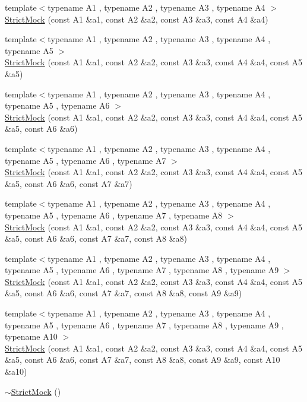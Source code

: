 \begin{DoxyCompactItemize}
\item 
{\footnotesize template$<$typename A1 , typename A2 , typename A3 , typename A4 $>$ }\\\mbox{\hyperlink{classtesting_1_1_strict_mock_a6b42ef1460901ea91a2a09f44ae8fba2}{Strict\+Mock}} (const A1 \&a1, const A2 \&a2, const A3 \&a3, const A4 \&a4)
\item 
{\footnotesize template$<$typename A1 , typename A2 , typename A3 , typename A4 , typename A5 $>$ }\\\mbox{\hyperlink{classtesting_1_1_strict_mock_a2019f4e86224b2adbb9e9326bc175c50}{Strict\+Mock}} (const A1 \&a1, const A2 \&a2, const A3 \&a3, const A4 \&a4, const A5 \&a5)
\item 
{\footnotesize template$<$typename A1 , typename A2 , typename A3 , typename A4 , typename A5 , typename A6 $>$ }\\\mbox{\hyperlink{classtesting_1_1_strict_mock_a17b452e1e2f57d7d10f7209587376eef}{Strict\+Mock}} (const A1 \&a1, const A2 \&a2, const A3 \&a3, const A4 \&a4, const A5 \&a5, const A6 \&a6)
\item 
{\footnotesize template$<$typename A1 , typename A2 , typename A3 , typename A4 , typename A5 , typename A6 , typename A7 $>$ }\\\mbox{\hyperlink{classtesting_1_1_strict_mock_a4af48752fc22815250369292b9c064bc}{Strict\+Mock}} (const A1 \&a1, const A2 \&a2, const A3 \&a3, const A4 \&a4, const A5 \&a5, const A6 \&a6, const A7 \&a7)
\item 
{\footnotesize template$<$typename A1 , typename A2 , typename A3 , typename A4 , typename A5 , typename A6 , typename A7 , typename A8 $>$ }\\\mbox{\hyperlink{classtesting_1_1_strict_mock_aac6eaaad3e94491ada7bb43ee6149775}{Strict\+Mock}} (const A1 \&a1, const A2 \&a2, const A3 \&a3, const A4 \&a4, const A5 \&a5, const A6 \&a6, const A7 \&a7, const A8 \&a8)
\item 
{\footnotesize template$<$typename A1 , typename A2 , typename A3 , typename A4 , typename A5 , typename A6 , typename A7 , typename A8 , typename A9 $>$ }\\\mbox{\hyperlink{classtesting_1_1_strict_mock_a4129f247ae087d586fdb04f450422d3e}{Strict\+Mock}} (const A1 \&a1, const A2 \&a2, const A3 \&a3, const A4 \&a4, const A5 \&a5, const A6 \&a6, const A7 \&a7, const A8 \&a8, const A9 \&a9)
\item 
{\footnotesize template$<$typename A1 , typename A2 , typename A3 , typename A4 , typename A5 , typename A6 , typename A7 , typename A8 , typename A9 , typename A10 $>$ }\\\mbox{\hyperlink{classtesting_1_1_strict_mock_a4936b0a5622b39e974deae12ecb1430b}{Strict\+Mock}} (const A1 \&a1, const A2 \&a2, const A3 \&a3, const A4 \&a4, const A5 \&a5, const A6 \&a6, const A7 \&a7, const A8 \&a8, const A9 \&a9, const A10 \&a10)
\item 
\mbox{\hyperlink{classtesting_1_1_strict_mock_a1c7ec10ea86747bb23037380a7353bd1}{$\sim$\+Strict\+Mock}} ()
\end{DoxyCompactItemize}
